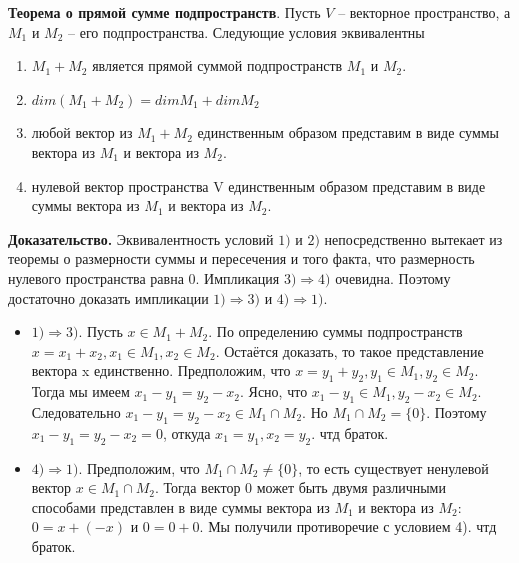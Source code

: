 \documentclass[a4paper]{article}
\begin{document}
    \begin{htheorem}
        \textbf{Теорема о прямой сумме подпространств}. Пусть $V$ – векторное пространство, а $M_1$ и $M_2$ – его подпространства. Следующие условия эквивалентны \begin{enumerate}
                                                                                                                                                                    \item $M_1 + M_2$ является прямой суммой подпространств $M_1$ и $M_2$.
                                                                                                                                                                    \item $dim(M_1+M_2) = dim M_1 + dim M_2$
                                                                                                                                                                    \item любой вектор из $M_1+M_2$ единственным образом представим в виде суммы вектора из $M_1$ и вектора из $M_2$.
                                                                                                                                                                    \item нулевой вектор пространства V единственным образом представим в виде суммы вектора из $M_1$ и вектора из $M_2$.
        \end{enumerate}
    \end{htheorem}

    \begin{hproof}
        \textbf{Доказательство.} Эквивалентность условий $1)$ и $2)$ непосредственно
        вытекает из теоремы о размерности суммы и пересечения и того факта,
        что размерность нулевого пространства равна $0$. Импликация $3) \Rightarrow 4)$
        очевидна. Поэтому достаточно доказать импликации $1) \Rightarrow 3)$ и $4) \Rightarrow 1)$.

        \begin{itemize}
            \item $1) \Rightarrow 3)$. Пусть $x \in M_1 + M_2$. По определению суммы подпространств $x = x_1 + x_2, x_1 \in M_1, x_2 \in M_2$. Остаётся доказать, то такое представление вектора x единственно. Предположим, что $x = y_1 + y_2, y_1 \in M_1, y_2 \in M_2$. Тогда мы имеем $x_1-y_1 = y_2 - x_2$. Ясно, что $x_1 - y_1 \in M_1, y_2-x_2 \in M_2$. Следовательно $x_1 - y_1 = y_2 - x_2 \in M_1 \cap M_2$.
            Но $M_1 \cap M_2 = \{ 0 \}$. Поэтому $x_1 - y_1 = y_2 - x_2 = 0$, откуда $x_1 = y_1, x_2 = y_2$. чтд браток.

            \item $4) \Rightarrow 1)$. Предположим, что $M_1 \cap M_2 \neq \{ 0 \}$, то есть существует ненулевой вектор $x \in M_1 \cap M_2$. Тогда вектор 0 может быть двумя различными способами представлен в виде суммы вектора из $M_1$ и вектора из $M_2$: $0 = x+(-x)$ и $0 = 0+0$. Мы получили противоречие с условием 4). чтд браток.
        \end{itemize}
    \end{hproof}
\end{document}
